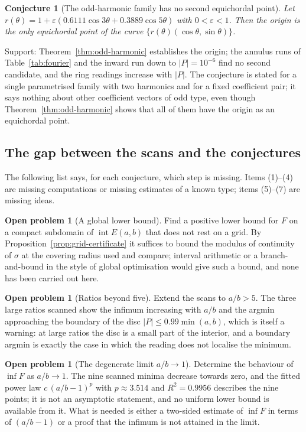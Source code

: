 \documentclass[11pt]{article}
\newtheorem{conjecture}[theorem]{Conjecture}
\theoremstyle{definition}
\newtheorem{problem}[theorem]{Open problem}
\theoremstyle{remark}
\begin{document}
\begin{conjecture}[The odd-harmonic family has no second equichordal point]\label{conjecture-fourier}
Let $r(\theta)=1+\varepsilon(0.6111\cos3\theta+0.3889\cos5\theta)$ with $0<\varepsilon<1$. Then the origin is the only
equichordal point of the curve $\{r(\theta)(\cos\theta,\sin\theta)\}$.
\end{conjecture}

Support: Theorem~\ref{thm:odd-harmonic} establishes the origin; the annulus runs of
Table~\ref{tab:fourier} and the inward run down to $|P|=10^{-6}$ find no second candidate, and the ring readings
increase with $|P|$. The conjecture is stated for a single parametrised family with two harmonics and for a fixed
coefficient pair; it says nothing about other coefficient vectors of odd type, even though
Theorem~\ref{thm:odd-harmonic} shows that all of them have the origin as an equichordal point.

\subsection{The gap between the scans and the conjectures}

The following list says, for each conjecture, which step is missing. Items (1)--(4) are missing computations or
missing estimates of a known type; items (5)--(7) are missing ideas.

\begin{problem}[A global lower bound]\label{prob:global}
Find a positive lower bound for $F$ on a compact subdomain of $\operatorname{int}E(a,b)$ that does not rest on a
grid. By Proposition~\ref{prop:grid-certificate} it suffices to bound the modulus of continuity of $\sigma$ at the
covering radius used and compare; interval arithmetic or a branch-and-bound in the style of global optimisation
would give such a bound, and none has been carried out here.
\end{problem}

\begin{problem}[Ratios beyond five]\label{prob:ratios}
Extend the scans to $a/b>5$. The three large ratios scanned show the infimum increasing with $a/b$ and the argmin
approaching the boundary of the disc $|P|\le0.99\min(a,b)$, which is itself a warning: at large ratios the disc is
a small part of the interior, and a boundary argmin is exactly the case in which the reading does not localise the
minimum.
\end{problem}

\begin{problem}[The degenerate limit $a/b\to1$]\label{prob:limit}
Determine the behaviour of $\inf F$ as $a/b\to1$. The nine scanned minima decrease towards zero, and the fitted
power law $c\,(a/b-1)^{p}$ with $p\approx3.514$ and $R^2=0.9956$ describes the nine points; it is not an asymptotic
statement, and no uniform lower bound is available from it. What is needed is either a two-sided estimate of
$\inf F$ in terms of $(a/b-1)$ or a proof that the infimum is not attained in the limit.
\end{problem}
\end{document}
